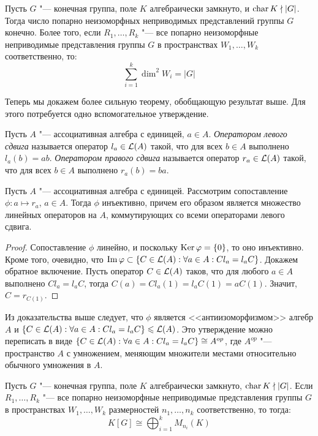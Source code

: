 \begin{corollary}
	Пусть $G$ "--- конечная группа, поле $K$ алгебраически замкнуто, и $\operatorname{char}{K} \nmid |G|$. Тогда число попарно неизоморфных неприводимых представлений группы $G$ конечно. Более того, если $R_1, \dotsc, R_k$ "--- все попарно неизоморфные неприводимые представления группы $G$ в пространствах $W_1, \dotsc, W_k$ соответственно, то:
	\[\sum_{i = 1}^k\dim^2{W_i} = |G|\]
\end{corollary}

Теперь мы докажем более сильную теорему, обобщающую результат выше. Для этого потребуется одно вспомогательное утверждение.

\begin{definition}
	Пусть $A$ "--- ассоциативная алгебра с единицей, $a \in A$. \textit{Оператором левого сдвига} называется оператор $l_a \in \mathcal L(A)$ такой, что для всех $b \in A$ выполнено $l_a(b) = ab$. \textit{Оператором правого сдвига} называется оператор $r_a \in \mathcal L(A)$ такой, что для всех $b \in A$ выполнено $r_a(b) = ba$.
\end{definition}

\begin{proposition}
	Пусть $A$ "--- ассоциативная алгебра с единицей. Рассмотрим сопоставление $\phi: a \mapsto r_a$, $a \in A$. Тогда $\phi$ инъективно, причем его образом является множество линейных операторов на $A$, коммутирующих со всеми операторами левого сдвига.
\end{proposition}

\begin{proof}
	Сопоставление $\phi$ линейно, и поскольку $\operatorname{Ker}\varphi = \{0\}$, то оно инъективно. Кроме того, очевидно, что $\operatorname{Im}\varphi \subset \{C\in \mathcal L(A): \forall a \in A: Cl_a = l_aC\}$. Докажем обратное включение. Пусть оператор $C \in \mathcal L(A)$ таков, что для любого $a \in A$ выполнено $Cl_a = l_aC$, тогда $C(a) = Cl_a(1) = l_aC(1) = aC(1)$. Значит, $C = r_{C(1)}$.
\end{proof}

\begin{note}
	Из доказательства выше следует, что $\phi$ является <<антиизоморфизмом>> алгебр $A$ и $\{C\in \mathcal L(A): \forall a \in A: Cl_a = l_aC\} \leqslant \mathcal L(A)$. Это утверждение можно переписать в виде $\{C\in \mathcal L(A): \forall a \in A: Cl_a = l_aC\} \cong A^{op}$, где $A^{op}$ "--- пространство $A$ с умножением, меняющим множители местами относительно обычного умножения в $A$.
\end{note}

\begin{theorem}
	Пусть $G$ "--- конечная группа, поле $K$ алгебраически замкнуто, $\operatorname{char}{K} \nmid |G|$. Если $R_1, \dotsc, R_k$ "--- все попарно неизоморфные неприводимые представления группы $G$ в пространствах $W_1, \dotsc, W_k$ размерностей $n_1, \dotsc, n_k$ соответственно, то тогда:
	\[K[G] \cong \bigoplus_{i=1}^kM_{n_i}(K)\]
\end{theorem}

